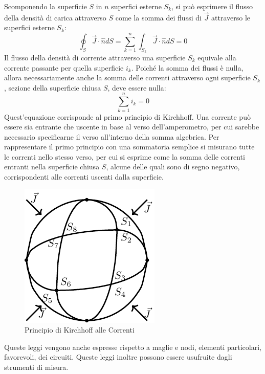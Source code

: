 \documentclass{article}
\numberwithin{equation}{subsection}
\begin{document}
Scomponendo la superficie $S$ in $n$ superfici esterne $S_k$, si può esprimere il flusso della densità di carica attraverso $S$ come la somma dei flussi di $\vec{J}$ attraverso 
le superfici esterne $S_k$:
\begin{equation*}
    \displaystyle\oint_{S}\vec{J}\cdot\hat{n}dS=\sum_{k=1}^n\int_{S_k}\vec{J}\cdot\hat{n}dS=0
\end{equation*}
Il flusso della densità di corrente attraverso una superficie $S_k$ equivale alla corrente passante per quella superficie $i_k$. Poiché la somma dei flussi è nulla, allora 
necessariamente anche la somma delle correnti attraverso ogni superficie $S_k$, sezione della superficie chiusa $S$, deve essere nulla:
\begin{equation}
    \displaystyle\sum_{k=1}^ni_k=0
\end{equation}
Quest'equazione corrisponde al primo principio di Kirchhoff. Una corrente può essere sia entrante che uscente in base al verso dell'amperometro, per cui sarebbe necessario 
specificarne il verso all'interno della somma algebrica. Per rappresentare il primo principio con una sommatoria semplice si misurano tutte le correnti nello stesso verso, 
per cui si esprime come la somma delle correnti entranti nella superficie chiusa $S$, alcune delle quali sono di segno negativo, corrispondenti alle correnti uscenti dalla 
superficie. 

\begin{figure}[H]%
    \centering
    \includegraphics{principio-kirchhoff-correnti.pdf}
    \caption{Principio di Kirchhoff alle Correnti}
    \label{fig:principio-kirchhoff-correnti}
\end{figure}

Queste leggi vengono anche espresse rispetto a maglie e nodi, elementi particolari, favorevoli, dei circuiti. Queste leggi inoltre possono essere usufruite dagli strumenti di 
misura. 
\end{document}
